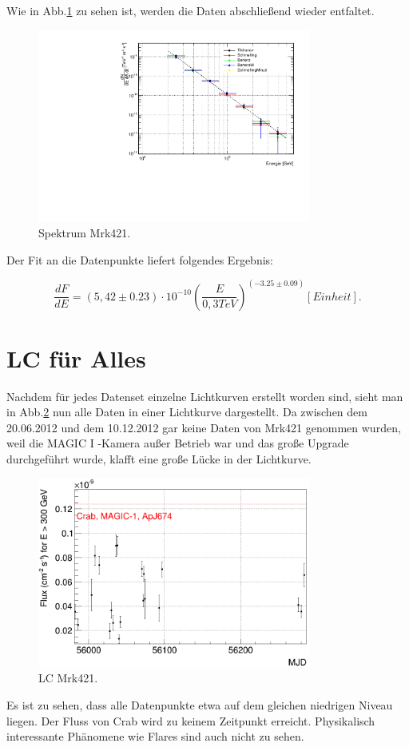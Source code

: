 Wie in Abb.\ref{Datenset3_Spektrum_Mrk421} zu sehen ist, werden die Daten abschließend wieder entfaltet.

\begin{figure}
    \centering
    \includegraphics[width=0.8\textwidth]{./Plots/04_MrkAnalyse/Datenset3/Datenset3_Mrk421_Spektrum.pdf}
    \caption{Spektrum Mrk421.}
    \label{Datenset3_Spektrum_Mrk421}
\end{figure}

Der Fit an die Datenpunkte liefert folgendes Ergebnis:

\begin{equation}
 \frac{dF}{dE}=(5,42 \pm 0.23) \cdot 10^{-10}\left( \frac{E}{0,3 \si{TeV}} \right)^{(-3.25 \pm 0.09)} [Einheit].
\end{equation}

\FloatBarrier


\section{LC für Alles}
\label{LC_Alles}

Nachdem für jedes Datenset einzelne Lichtkurven erstellt worden sind, sieht man in Abb.\ref{Alles_LC_Mrk421} nun alle Daten in einer Lichtkurve dargestellt.
Da zwischen dem 20.06.2012 und dem 10.12.2012 gar keine Daten von Mrk421 genommen wurden, weil die MAGIC I -Kamera außer Betrieb war und das große Upgrade durchgeführt wurde, klafft eine große Lücke in der Lichtkurve.

\begin{figure}
    \centering
    \includegraphics[width=0.8\textwidth]{./Plots/04_MrkAnalyse/Alles_LC.png}
    \caption{LC Mrk421.}
    \label{Alles_LC_Mrk421}
\end{figure}

Es ist zu sehen, dass alle Datenpunkte etwa auf dem gleichen niedrigen Niveau liegen.
Der Fluss von Crab wird zu keinem Zeitpunkt erreicht. 
Physikalisch interessante Phänomene wie Flares sind auch nicht zu sehen.
